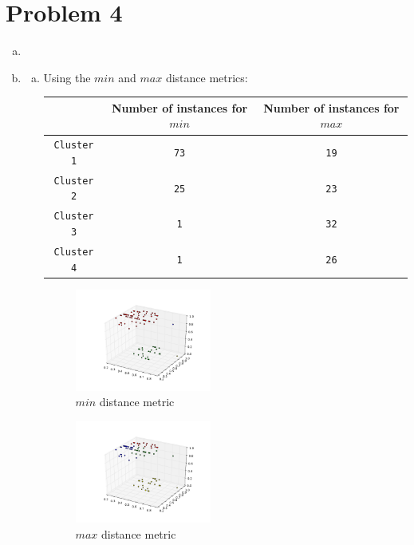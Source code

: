 \documentclass{article}
\begin{document}
\section*{Problem 4}

\begin{enumerate}[a.]


\item %

\newpage
\item %

\begin{enumerate}[(a)]

\item %
Using the $min$ and $max$ distance metrics:\\

\begin{center}
       \begin{tabular}{|c|c|c|} \hline
           & Number of instances for $min$ & Number of instances for $max$\\ \hline
            \verb|Cluster 1| & \verb|73| & \verb|19|\\ \hline
            \verb|Cluster 2| & \verb|25| & \verb|23|\\ \hline
            \verb|Cluster 3| & \verb|1| & \verb|32|\\ \hline
            \verb|Cluster 4| & \verb|1| & \verb|26|\\ \hline
        \end{tabular}

\end{center}
\begin{figure}[htb]
\begin{center}
\includegraphics[width=0.45\textwidth]{3dplot_4_100_min.pdf}
\caption{$min$ distance metric}
\end{center}
\end{figure}

\begin{figure}[htb]
\begin{center}
\includegraphics[width=0.45\textwidth]{3dplot_4_100_max.pdf}
\caption{$max$ distance metric}
\end{center}
\end{figure}


\end{enumerate}
\end{enumerate}
\end{document}
